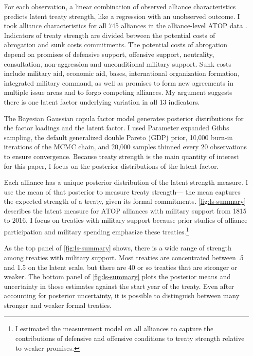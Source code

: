 \documentclass[12pt]{article}
\begin{document}
For each observation, a linear combination of observed alliance characteristics predicts latent treaty strength, like a regression with an unobserved outcome.  
I took alliance characteristics for all 745 alliances in the alliance-level ATOP data \citep{Leedsetal2002}. 
Indicators of treaty strength are divided between the potential costs of abrogation and sunk costs commitments.
The potential costs of abrogation depend on promises of defensive support, offensive support, neutrality, consultation, non-aggression and unconditional military support. 
Sunk costs include military aid, economic aid, bases, international organization formation, integrated military command, as well as promises to form new agreements in multiple issue areas and to forgo competing alliances. 
My argument suggests there is one latent factor underlying variation in all 13 indicators.


The Bayesian Gaussian copula factor model generates posterior distributions for the factor loadings and the latent factor. 
I used Parameter expanded Gibbs sampling, the default generalized double Pareto (GDP) prior, 10,000 burn-in iterations of the MCMC chain, and 20,000 samples thinned every 20 observations to ensure convergence. 
Because treaty strength is the main quantity of interest for this paper, I focus on the posterior distributions of the latent factor. 


Each alliance has a unique posterior distribution of the latent strength measure. 
I use the mean of that posterior to measure treaty strength--- the mean captures the expected strength of a treaty, given its formal commitments. 
\autoref{fig:ls-summary} describes the latent measure for ATOP alliances  with military support from 1815 to 2016.
I focus on treaties with military support because prior studies of alliance participation and military spending emphasize these treaties.\footnote{
I estimated the measurement model on all alliances to capture the contributions of defensive and offensive conditions to treaty strength relative to weaker promises.
}


As the top panel of \autoref{fig:ls-summary} shows, there is a wide range of strength among treaties with military support. 
Most treaties are concentrated between .5 and 1.5 on the latent scale, but there are 40 or so treaties that are stronger or weaker. 
The bottom panel of \autoref{fig:ls-summary} plots the posterior means and uncertainty in those estimates against the start year of the treaty. 
Even after accounting for posterior uncertainty, it is possible to distinguish between many stronger and weaker formal treaties. 
\end{document}
